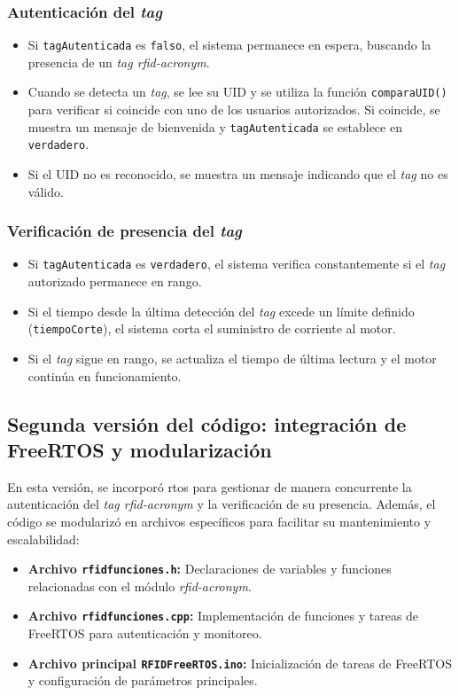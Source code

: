 \subsubsection{Autenticación del \textit{tag}}
\begin{itemize}
    \item Si \texttt{tagAutenticada} es \texttt{falso}, el sistema permanece en espera, buscando la presencia de un \textit{tag \acrshort{rfid-acronym}}.
    \item Cuando se detecta un \textit{tag}, se lee su UID y se utiliza la función \texttt{comparaUID()} para verificar si coincide con uno de los usuarios autorizados. Si coincide, se muestra un mensaje de bienvenida y \texttt{tagAutenticada} se establece en \texttt{verdadero}.
    \item Si el UID no es reconocido, se muestra un mensaje indicando que el \textit{tag} no es válido.
\end{itemize}

\subsubsection{Verificación de presencia del \textit{tag}}
\begin{itemize}
    \item Si \texttt{tagAutenticada} es \texttt{verdadero}, el sistema verifica constantemente si el \textit{tag} autorizado permanece en rango.
    \item Si el tiempo desde la última detección del \textit{tag} excede un límite definido (\texttt{tiempoCorte}), el sistema corta el suministro de corriente al motor.
    \item Si el \textit{tag} sigue en rango, se actualiza el tiempo de última lectura y el motor continúa en funcionamiento.
\end{itemize}

\subsection{Segunda versión del código: integración de FreeRTOS y modularización}

En esta versión, se incorporó \gls{rtos} para gestionar de manera concurrente la autenticación del \textit{tag \acrshort{rfid-acronym}} y la verificación de su presencia. Además, el código se modularizó en archivos específicos para facilitar su mantenimiento y escalabilidad:

\begin{itemize}
    \item \textbf{Archivo \texttt{rfidfunciones.h}:} Declaraciones de variables y funciones relacionadas con el módulo \textit{\acrshort{rfid-acronym}}.
    \item \textbf{Archivo \texttt{rfidfunciones.cpp}:} Implementación de funciones y tareas de FreeRTOS para autenticación y monitoreo.
    \item \textbf{Archivo principal \texttt{RFIDFreeRTOS.ino}:} Inicialización de tareas de FreeRTOS y configuración de parámetros principales.
\end{itemize}

